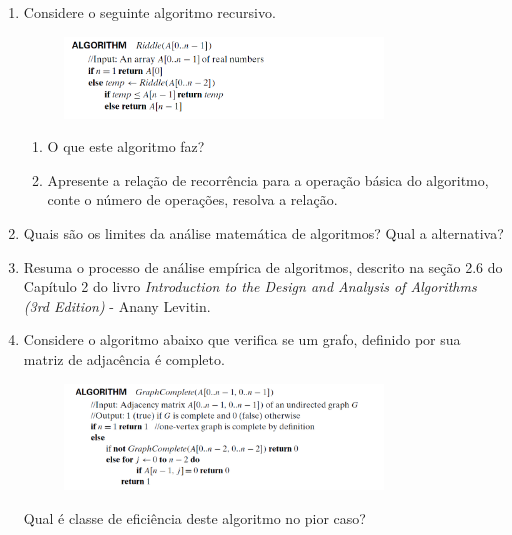 \documentclass{article}
\begin{document}
\begin{enumerate}
    \item Considere o seguinte algoritmo recursivo.
    
    \begin{figure}[!ht]
        \centering
        \includegraphics[width=0.8\textwidth]{alg_a.PNG}
        \label{fig:alg_a}
    \end{figure}
    
    \begin{enumerate}
        \item O que este algoritmo faz?
        \item Apresente a relação de recorrência para a operação básica do algoritmo, conte o número de operações, resolva a relação.
    \end{enumerate}
    
    \item Quais são os limites da análise matemática de algoritmos? Qual a alternativa?
    
    \item Resuma o processo de análise empírica de algoritmos, descrito na seção 2.6 do Capítulo 2 do livro \textit{Introduction to the Design and Analysis of Algorithms (3rd Edition)} - Anany Levitin.
    
    \item Considere o algoritmo abaixo que verifica se um grafo, definido por sua matriz de adjacência é completo. 
    
    \begin{figure}[!ht]
        \centering
        \includegraphics[width=0.8\textwidth]{alg_b.PNG}
        \label{fig:alg_b}
    \end{figure}
    
    Qual é classe de eficiência deste algoritmo no pior caso? 
\end{enumerate}

%
%
\end{document}

